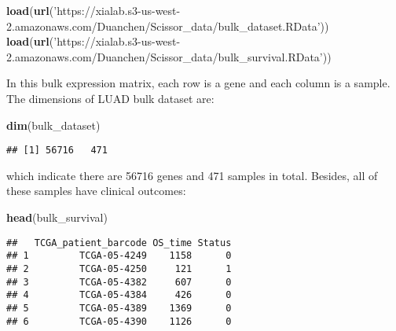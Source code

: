 \documentclass[]{article}
\newenvironment{Shaded}{\begin{snugshade}}{\end{snugshade}}
\newcommand{\KeywordTok}[1]{\textcolor[rgb]{0.13,0.29,0.53}{\textbf{#1}}}
\newcommand{\StringTok}[1]{\textcolor[rgb]{0.31,0.60,0.02}{#1}}
\newcommand{\OperatorTok}[1]{\textcolor[rgb]{0.81,0.36,0.00}{\textbf{#1}}}
\newcommand{\NormalTok}[1]{#1}
\begin{document}
\begin{Shaded}
\begin{Highlighting}[]
\KeywordTok{load}\NormalTok{(}\KeywordTok{url}\NormalTok{(}\StringTok{'https://xialab.s3-us-west-2.amazonaws.com/Duanchen/Scissor_data/bulk_dataset.RData'}\NormalTok{))}
\KeywordTok{load}\NormalTok{(}\KeywordTok{url}\NormalTok{(}\StringTok{'https://xialab.s3-us-west-2.amazonaws.com/Duanchen/Scissor_data/bulk_survival.RData'}\NormalTok{))}
\end{Highlighting}
\end{Shaded}

In this bulk expression matrix, each row is a gene and each column is a
sample. The dimensions of LUAD bulk dataset are:

\begin{Shaded}
\begin{Highlighting}[]
\KeywordTok{dim}\NormalTok{(bulk_dataset)}
\end{Highlighting}
\end{Shaded}

\begin{verbatim}
## [1] 56716   471
\end{verbatim}

which indicate there are 56716 genes and 471 samples in total. Besides,
all of these samples have clinical outcomes:

\begin{Shaded}
\begin{Highlighting}[]
\KeywordTok{head}\NormalTok{(bulk_survival)}
\end{Highlighting}
\end{Shaded}

\begin{verbatim}
##   TCGA_patient_barcode OS_time Status
## 1         TCGA-05-4249    1158      0
## 2         TCGA-05-4250     121      1
## 3         TCGA-05-4382     607      0
## 4         TCGA-05-4384     426      0
## 5         TCGA-05-4389    1369      0
## 6         TCGA-05-4390    1126      0
\end{verbatim}

\begin{Shaded}
\end{Shaded}
\end{document}
